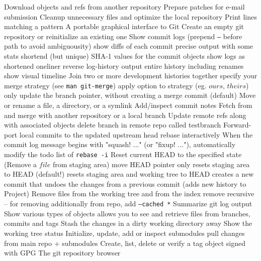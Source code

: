 	{Download objects and refs from another repository}
	{Prepare patches for e-mail submission}
	{Cleanup unnecessary files and optimize the local repository}
	{Print lines matching a pattern}
	{A portable graphical interface to Git}
	{Create an empty git repository or reinitialize an existing one}
	{Show commit logs (prepend {\tt --} before path to avoid ambiguousity)}
	{show diffs of each commit}
	{precise output with some stats}
	{shortend (but unique) SHA-1 values for the commit objects }
	{show logs as shortened oneliner}
	{reverse log-history output}
	{entire history including renames}
	{show visual timeline}
	{Join two or more development histories together}
	{specify your merge strategy (see {\tt man git-merge})}
	{apply option to strategy (eg. $ours$, $theirs$)}
	{only update the branch pointer, without creating a merge commit (default)}
	{Move or rename a file, a directory, or a symlink}
	{Add/inspect commit notes}
	{Fetch from and merge with another re\-pository or a local branch}
	{Update remote refs along with associated objects}
	{delete branch in remote repo called testbranch}
	{Forward-port local commits to the updated upstream head}
	{rebase interactively}
	{When the commit log message begins with "squash! ..." (or "fixup! ..."), automatically modify the todo list of {\tt rebase -i} }
	{Reset current HEAD to the specified state (Remove a $file$ from staging area)}
	{move HEAD pointer only}
	{resets staging area to HEAD (default!)}
	{resets staging area and working tree to HEAD}
	{creates a new commit that undoes the changes from a previous commit (adds new history to Project)}
	{Remove files from the working tree and from the index}
	{remove recursive -- for removing additionally from repo, add
{\tt --cached *}}
	{Summarize git log output}
	{Show various types of objects}
	{allows you to see and retrieve files from bran\-ches, commits and tags}
	{Stash the changes in a dirty working directory away}
	{Show the working tree status}
	{Initialize, update, add or inspect submodules}
	{pull changes from main repo + submodules}
	{Create, list, delete or verify a tag object signed with GPG}
	{The git repository browser}

